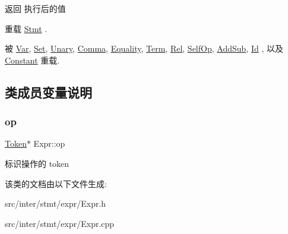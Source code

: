 \begin{DoxyReturn}{返回}
执行后的值 
\end{DoxyReturn}


重载 \hyperlink{class_stmt_abdc3261770c3c5bd3ce5b3ba6eedfaa4}{Stmt} .



被 \hyperlink{class_var_a9dc96e803f7b0f9aa519c2c0e0a6bd8f}{Var}, \hyperlink{class_set_a7776ba36f3af8b09772b36927beb5f5c}{Set}, \hyperlink{class_unary_af42edff1ee4718a9afeb7127e41af758}{Unary}, \hyperlink{class_comma_aab9ca2bb70a10abd2fb263de745f843a}{Comma}, \hyperlink{class_equality_a0255c33af70613b006b03a329ed329ff}{Equality}, \hyperlink{class_term_ac2d20115da73f9425e5d390856a211a1}{Term}, \hyperlink{class_rel_a82b2f3b75a2b9e81631f2659d42a36d1}{Rel}, \hyperlink{class_self_op_ab452bcad1cd4f1286813b1f737583818}{Self\+Op}, \hyperlink{class_add_sub_a73c0513a31a5400fdfc79ce877a1c3b9}{Add\+Sub}, \hyperlink{class_id_ae43a9ffecbbc0ac4fd041b8e8e3c3de0}{Id} , 以及 \hyperlink{class_constant_ab5c55607bcff5ce70131a588b6bdbed7}{Constant} 重载.



\subsection{类成员变量说明}
\mbox{\label{class_expr_a5fd7721b7843686e3ec7e63fddf95644}} 
\subsubsection{\texorpdfstring{op}{op}}
{\footnotesize\ttfamily \hyperlink{class_token}{Token}$\ast$ Expr\+::op}

标识操作的 token 

该类的文档由以下文件生成\+:\begin{DoxyCompactItemize}
\item 
src/inter/stmt/expr/Expr.\+h\item 
src/inter/stmt/expr/Expr.\+cpp\end{DoxyCompactItemize}
